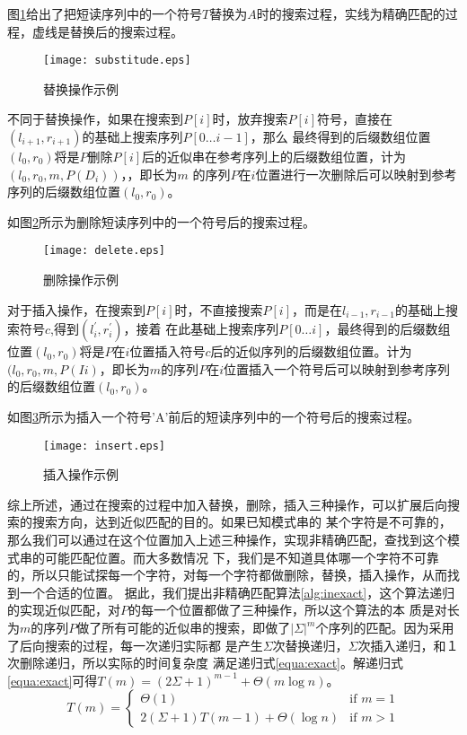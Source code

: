 图\ref{fig:substitude}给出了把短读序列中的一个符号$T$替换为$A$时的搜索过程，实线为精确匹配的过程，虚线是替换后的搜索过程。

\begin{figure}[htbp]
    \centering
    \texttt{[image: substitude.eps]}
    \caption{替换操作示例} \label{fig:substitude}
\end{figure}

不同于替换操作，如果在搜索到$P[i]$时，放弃搜索$P[i]$符号，直接在$(l_{i+1},r_{i+1})$的基础上搜索序列$P[0\ldots i-1]$，那么
最终得到的后缀数组位置$(l_0,r_0)$将是$P$删除$P[i]$后的近似串在参考序列上的后缀数组位置，计为$(l_0,r_0,m,P(D_i))$，，即长为$m$
的序列$P$在$i$位置进行一次删除后可以映射到参考序列的后缀数组位置$(l_0,r_0)$。

如图\ref{fig:delete}所示为删除短读序列中的一个符号后的搜索过程。

\begin{figure}[htbp]
    \centering
    \texttt{[image: delete.eps]}
    \caption{删除操作示例} \label{fig:delete}
\end{figure}

对于插入操作，在搜索到$P[i]$时，不直接搜索$P[i]$，而是在$l_{i-1},r_{i-1}$的基础上搜索符号$c$,得到$(l_{i}^{'},r_{i}^{'})$，接着
在此基础上搜索序列$P[0\ldots i]$，最终得到的后缀数组位置$(l_0,r_0)$将是$P$在$i$位置插入符号$c$后的近似序列的后缀数组位置。计为
$(l_0,r_0,m,P(Ii)$，即长为$m$的序列$P$在$i$位置插入一个符号后可以映射到参考序列的后缀数组位置$(l_0,r_0)$。

如图\ref{fig:insert}所示为插入一个符号'A'前后的短读序列中的一个符号后的搜索过程。

\begin{figure}[htbp]
    \centering
    \texttt{[image: insert.eps]}
    \caption{插入操作示例} \label{fig:insert}
\end{figure}

综上所述，通过在搜索的过程中加入替换，删除，插入三种操作，可以扩展后向搜索的搜索方向，达到近似匹配的目的。如果已知模式串的
某个字符是不可靠的，那么我们可以通过在这个位置加入上述三种操作，实现非精确匹配，查找到这个模式串的可能匹配位置。而大多数情况
下，我们是不知道具体哪一个字符不可靠的，所以只能试探每一个字符，对每一个字符都做删除，替换，插入操作，从而找到一个合适的位置。
据此，我们提出非精确匹配算法\ref{alg:inexact}，这个算法递归的实现近似匹配，对$P$的每一个位置都做了三种操作，所以这个算法的本
质是对长为$m$的序列$P$做了所有可能的近似串的搜索，即做了$|\Sigma|^m$个序列的匹配。因为采用了后向搜索的过程，每一次递归实际都
是产生$\Sigma$次替换递归，$\Sigma$次插入递归，和１次删除递归，所以实际的时间复杂度
满足递归式\ref{equa:exact}。解递归式\ref{equa:exact}可得$T(m)=(2\Sigma+1)^{m-1}+\Theta(m\log n)$。
\begin{equation}\label{equa:exact}
    T(m)=\begin{cases}\Theta(1) & \mbox{if } m=1 \\
    2(\Sigma+1)T(m-1)+\Theta(\log n) & \mbox{if } m>1\end{cases}
\end{equation}

